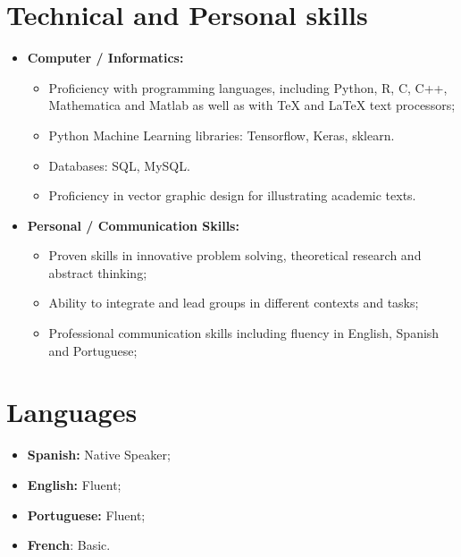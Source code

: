 \documentclass[11pt,a4paper,sans]{moderncv}        %
\begin{document}
\section{Technical and Personal skills}

\vspace{4pt}

\begin{itemize}

\item \textbf{Computer / Informatics:} 
\begin{itemize}
\item Proficiency with programming languages, including Python, R, C, C++, Mathematica and Matlab as well as with TeX and LaTeX text processors;
\item Python Machine Learning libraries: Tensorflow, Keras, sklearn.
\item Databases: SQL, MySQL.
\item Proficiency in vector graphic design for illustrating academic texts. 
\end{itemize}

\item \textbf{Personal / Communication Skills:} 

\begin{itemize}
\item Proven skills in innovative problem solving, theoretical research and abstract thinking;
\vspace{1pt}
\item Ability to integrate and lead groups in different contexts and tasks; 
\vspace{1pt}
\item Professional communication skills including fluency in English, Spanish and Portuguese;

\end{itemize}

\end{itemize}
\section{Languages}
\vspace{4pt}
\begin{itemize}
\item{\textbf{Spanish:}} Native Speaker;
\item{\textbf{English:}} Fluent;
\item{\textbf{Portuguese:}} Fluent;
\item{\textbf{French}:} Basic.
\end{itemize}
\end{document}
